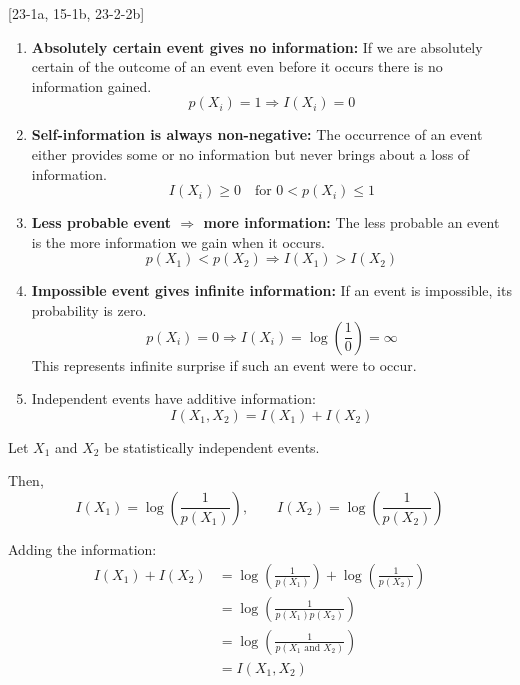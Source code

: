 \documentclass[11pt,a4paper]{book}
\newenvironment{infobox}[1][Information]{
    \begin{tcolorbox}[
        enhanced,
        breakable,
        colback=mintgreen!10,
        colframe=mintgreen!200,
        title=#1,
        fonttitle=\bfseries,
        sharp corners,
        boxrule=0.8pt,
        left=8pt,
        right=8pt,
        top=6pt,
        bottom=6pt
    ]
}{
    \end{tcolorbox}
}
\newenvironment{derivationbox}[1][Derivation]{
    \begin{tcolorbox}[
        enhanced,
        breakable,
        colback=softpeach!10,
        colframe=softpeach!200,
        title=#1,
        fonttitle=\bfseries,
        sharp corners,
        boxrule=0.8pt,
        left=10pt,
        right=10pt,
        top=8pt,
        bottom=8pt
    ]
}{
    \end{tcolorbox}
}
\begin{document}
\begin{infobox}[Properties of Self-Information]
[23-1a, 15-1b, 23-2-2b]
    \begin{enumerate}
        \item \textbf{Absolutely certain event gives no information:} If we are absolutely certain of the outcome of an event even before it occurs there is no information gained.
              \[
                  p(X_i)=1 \Rightarrow I(X_i)=0
              \]
        \item \textbf{Self-information is always non-negative:} The occurrence of an event either provides some or no information but never brings about a loss of information.
              \[
                  I(X_i)\ge 0 \quad \text{for } 0<p(X_i)\le 1
              \]
        \item \textbf{Less probable event $\Rightarrow$ more information:} The less probable an event is the more information we gain when it occurs.
              \[
                  p(X_1)<p(X_2) \Rightarrow I(X_1)>I(X_2)
              \]
        \item \textbf{Impossible event gives infinite information:}
          If an event is impossible, its probability is zero.
          \[
              p(X_i)=0 \Rightarrow I(X_i)=\log\left(\frac{1}{0}\right)=\infty
          \]
          This represents infinite surprise if such an event were to occur.
        \item Independent events have additive information:
      \[
          I(X_1,X_2)=I(X_1)+I(X_2)
      \]
\end{enumerate}
      \begin{derivationbox}[Additivity of Self-Information]
          Let \(X_1\) and \(X_2\) be statistically independent events.

          Then,
          \[
              I(X_1) = \log\left(\frac{1}{p(X_1)}\right),
              \qquad
              I(X_2) = \log\left(\frac{1}{p(X_2)}\right)
          \]

          Adding the information:
          \begin{align*}
              I(X_1) + I(X_2)
                & = \log\left(\frac{1}{p(X_1)}\right)
                  + \log\left(\frac{1}{p(X_2)}\right) \\
                & = \log\left(\frac{1}{p(X_1)p(X_2)}\right)\\
                & = \log\left(\frac{1}{p(X_1 \text{ and } X_2)}\right)\\
                & = I(X_1, X_2)
          \end{align*}
      \end{derivationbox}
\end{infobox}
\end{document}
